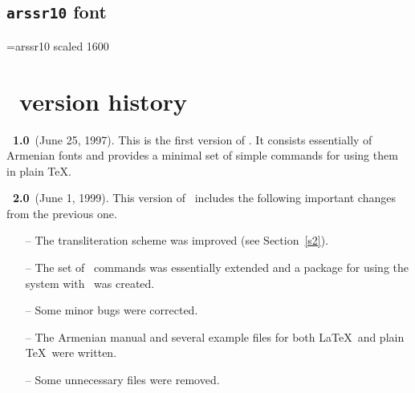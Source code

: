 \documentclass[12pt,a4paper,draft]{article}
\def\myindent{\leavevmode}
\begin{document}
\newpage
\subsection{{\tt\bfseries arssr10} font}

\font\trialfont=arssr10 scaled 1600
\aghyusak


\newpage
\section{\latArmTeX\ version history}

\myindent \textbf{\latArmTeX\ 1.0}\ (June 25, 1997). This is the first version
of \latArmTeX. It consists essentially of Armenian fonts and provides a
minimal set of simple commands for using them in plain \TeX.

\bigskip\bigskip

\noindent \textbf{\latArmTeX\ 2.0}\ (June 1, 1999). This version of
\latArmTeX\ includes the following important changes from the previous one.
\begin{itemize}
%
\item[--]The transliteration scheme was improved (see Section~\ref{s2}).
%
\item[--]The set of \latArmTeX\ commands was essentially extended and a
  package for using the system with \LaTeXe\ was created.
%
\item[--]Some minor bugs were corrected.
%
\item[--]The Armenian manual and several example files for both \LaTeX\ and
  plain \TeX\ were written.
%
\item[--]Some unnecessary files were removed.
%
\end{itemize}
\end{document}

